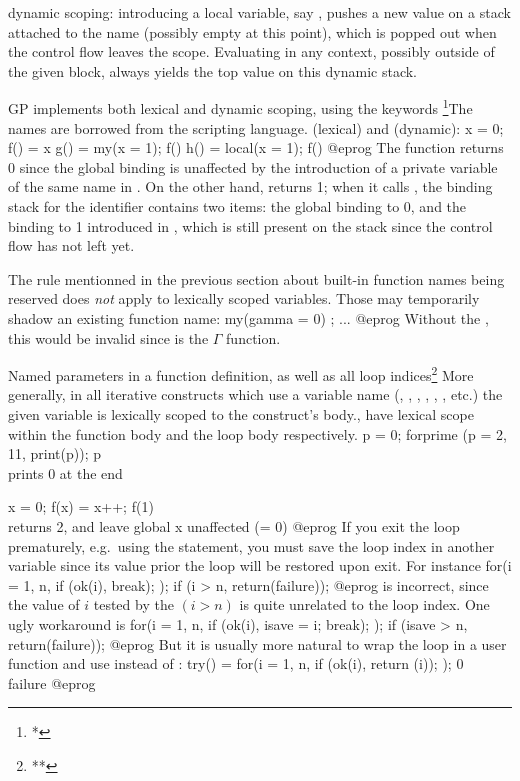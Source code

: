 \item{} dynamic scoping: introducing a local variable,
say , pushes a new value on a stack attached to the name 
(possibly empty at this point), which is popped out when the control flow
leaves the scope. Evaluating  in any context, possibly outside of the
given block, always yields the top value on this dynamic stack.

GP implements both lexical and dynamic scoping, using the keywords%
\footnote{*}{The names are borrowed from the  scripting language.}
 (lexical) and  (dynamic):
\bprog
  x = 0;
  f() = x
  g() =    my(x = 1); f()
  h() = local(x = 1); f()
@eprog\noindent
The function  returns 0 since the global  binding
is unaffected by the introduction of a private variable of the same name in
. On the other hand,  returns 1; when it calls , the
binding stack for the  identifier contains two items: the global
binding to 0, and the binding to 1 introduced in , which is still
present on the stack since the control flow has not left  yet.

The rule mentionned in the previous section about built-in function names
being reserved does \emph{not} apply to lexically scoped variables. Those may
temporarily shadow an existing function name:
\bprog
  my(gamma = 0) ; ...
@eprog
Without the , this would be invalid since  is the $\Gamma$
function.


Named parameters in a function definition, as well as all loop
indices\footnote{**}{
More generally, in all iterative constructs which use a variable name
(, , , , ,
, etc.) the given variable is lexically scoped to the construct's
body.},
have lexical scope within the function body and the loop body respectively.
\bprog
p = 0;
forprime (p = 2, 11, print(p)); p   \\ prints 0 at the end

x = 0;
f(x) = x++;
f(1)  \\ returns 2, and leave global x unaffected (= 0)
@eprog\noindent
If you exit the loop prematurely, e.g.~using the  statement, you
must save the loop index in another variable since its value prior the loop
will be restored upon exit. For instance
\bprog
  for(i = 1, n,
    if (ok(i), break);
  );
  if (i > n, return(failure));
@eprog\noindent
is incorrect, since the value of $i$ tested by the $(i > n)$ is quite
unrelated to the loop index. One ugly workaround is
\bprog
  for(i = 1, n,
    if (ok(i), isave = i; break);
  );
  if (isave > n, return(failure));
@eprog\noindent
But it is usually more natural to wrap the loop in a user function
and use  instead of :
\bprog
try() =
{
  for(i = 1, n,
    if (ok(i), return (i));
  );
  0 \\ failure
}
@eprog

